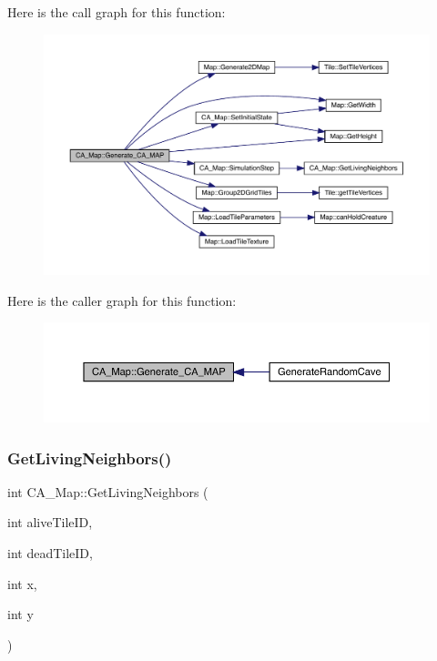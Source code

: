 Here is the call graph for this function\+:\nopagebreak
\begin{figure}[H]
\begin{center}
\leavevmode
\includegraphics[width=350pt]{df/dfe/class_c_a___map_a8db5cbcb8cef56f0ac58571425502b59_cgraph}
\end{center}
\end{figure}
Here is the caller graph for this function\+:
\nopagebreak
\begin{figure}[H]
\begin{center}
\leavevmode
\includegraphics[width=350pt]{df/dfe/class_c_a___map_a8db5cbcb8cef56f0ac58571425502b59_icgraph}
\end{center}
\end{figure}
\mbox{\label{class_c_a___map_ad57529f17a77b590fe93839c4b8bd5f9}} 
\subsubsection{\texorpdfstring{Get\+Living\+Neighbors()}{GetLivingNeighbors()}}
{\footnotesize\ttfamily int C\+A\+\_\+\+Map\+::\+Get\+Living\+Neighbors (\begin{DoxyParamCaption}\item[{int}]{alive\+Tile\+ID,  }\item[{int}]{dead\+Tile\+ID,  }\item[{int}]{x,  }\item[{int}]{y }\end{DoxyParamCaption})}

